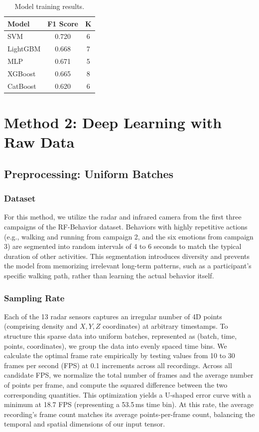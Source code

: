 \documentclass{article}
\begin{document}
\begin{table}[!t]
\centering
\scriptsize
\caption{Model training results.}
\label{tab:model_results}
\begin{tabular}{lcc}
\toprule
\textbf{Model} & \textbf{F1 Score} & \textbf{K} \\
\midrule
SVM        & 0.720 & 6 \\
LightGBM  & 0.668 & 7 \\
MLP       & 0.671 & 5 \\
XGBoost   & 0.665 & 8 \\
CatBoost  & 0.620 & 6 \\
\bottomrule
\end{tabular}
\end{table}

\section{Method 2: Deep Learning with Raw Data}

\subsection{Preprocessing: Uniform Batches}

\subsubsection{Dataset}

For this method, we utilize the radar and infrared camera from the first three campaigns of the RF-Behavior dataset. Behaviors with highly repetitive actions (e.g., walking and running from campaign 2, and the six emotions from campaign 3) are segmented into random intervals of 4 to 6 seconds to match the typical duration of other activities. This segmentation introduces diversity and prevents the model from memorizing irrelevant long-term patterns, such as a participant's specific walking path, rather than learning the actual behavior itself.

\subsubsection{Sampling Rate}

Each of the 13 radar sensors captures an irregular number of 4D points (comprising density and $X, Y, Z$ coordinates) at arbitrary timestamps. To structure this sparse data into uniform batches, represented as (batch, time, points, coordinates), we group the data into evenly spaced time bins. We calculate the optimal frame rate empirically by testing values from 10 to 30 frames per second (FPS) at 0.1 increments across all recordings. Across all candidate FPS, we normalize the total number of frames and the average number of points per frame, and compute the squared difference between the two corresponding quantities. This optimization yields a U-shaped error curve with a minimum at 18.7 FPS (representing a 53.5\,ms time bin). At this rate, the average recording's frame count matches its average points-per-frame count, balancing the temporal and spatial dimensions of our input tensor.
\end{document}
